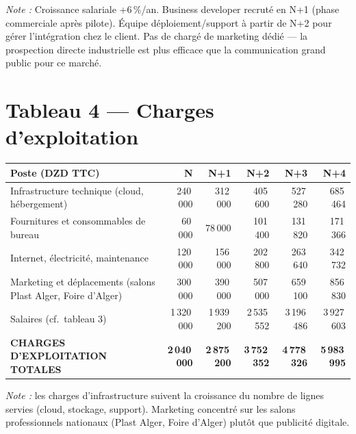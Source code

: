 \documentclass[11pt,a4paper]{article}
\begin{document}
\noindent\textit{Note :} Croissance salariale +6\,\%/an. Business developer recruté en N+1 (phase commerciale après pilote). Équipe déploiement/support à partir de N+2 pour gérer l'intégration chez le client. Pas de chargé de marketing dédié — la prospection directe industrielle est plus efficace que la communication grand public pour ce marché.

\section{Tableau 4 — Charges d'exploitation}

\begin{center}
\small
\begin{longtable}{l r r r r r}
\toprule
\textbf{Poste (DZD TTC)} & \textbf{N} & \textbf{N+1} & \textbf{N+2} & \textbf{N+3} & \textbf{N+4} \\
\midrule
\endhead

Infrastructure technique (cloud, hébergement) & 240\,000 & 312\,000 & 405\,600 & 527\,280 & 685\,464 \\
Fournitures et consommables de bureau        &  60\,000 &  78\,000 & 101\,400 & 131\,820 & 171\,366 \\
Internet, électricité, maintenance           & 120\,000 & 156\,000 & 202\,800 & 263\,640 & 342\,732 \\
Marketing et déplacements (salons Plast Alger, Foire d'Alger) & 300\,000 & 390\,000 & 507\,000 & 659\,100 & 856\,830 \\
Salaires (cf.\ tableau 3)                    & 1\,320\,000 & 1\,939\,200 & 2\,535\,552 & 3\,196\,486 & 3\,927\,603 \\
\midrule
\rowcolor{tabletot}\color{white}\bfseries
\textbf{CHARGES D'EXPLOITATION TOTALES}      & \textbf{2\,040\,000} & \textbf{2\,875\,200} & \textbf{3\,752\,352} & \textbf{4\,778\,326} & \textbf{5\,983\,995} \\
\bottomrule
\end{longtable}
\end{center}

\noindent\textit{Note :} les charges d'infrastructure suivent la croissance du nombre de lignes servies (cloud, stockage, support). Marketing concentré sur les salons professionnels nationaux (Plast Alger, Foire d'Alger) plutôt que publicité digitale.

\end{document}
